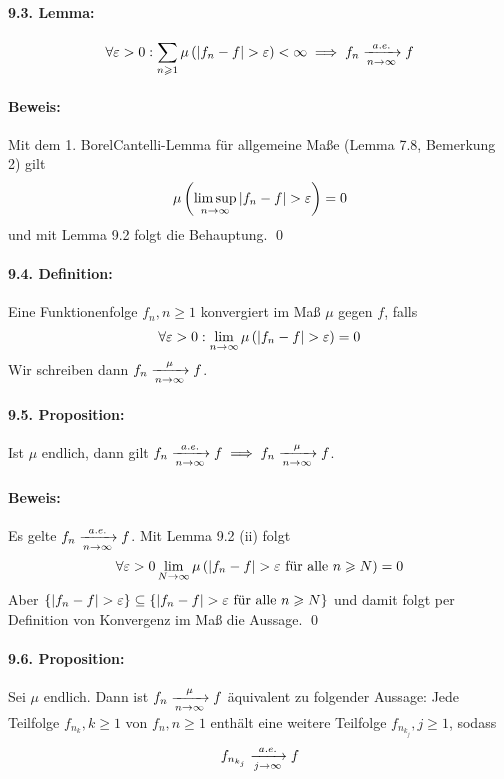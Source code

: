 \paragraph{9.3. Lemma:}
$$\forall\eps>0:\sum_{n\geq1}\mu\left(|f_n-f|>\eps\right)<\infty\implies f_n\nto{a.e.}{n\to\infty}f$$

\paragraph{Beweis:}Mit dem 1. Borel\textendash Cantelli-Lemma f\"ur allgemeine Ma\ss{}e (Lemma 7.8, Bemerkung 2) gilt 
$$\mu\left(\limsup_{n\to\infty}{|f_n-f|>\eps}\right)=0$$
und mit Lemma 9.2 folgt die Behauptung. \qed

\paragraph{9.4. Definition:}Eine Funktionenfolge $f_n,n\geq1$ konvergiert im Ma\ss{} $\mu$ gegen $f$, falls
$$\forall\eps>0:\lim_{n\to\infty}\mu\left(|f_n-f|>\eps\right)=0$$
Wir schreiben dann $f_n\nto{\mu}{n\to\infty}f$.

\paragraph{9.5. Proposition:}Ist $\mu$ endlich, dann gilt $f_n\nto{a.e.}{n\to\infty}f\implies f_n\nto{\mu}{n\to\infty}f$.

\paragraph{Beweis:}Es gelte $f_n\nto{a.e.}{n\to\infty}f$. Mit Lemma 9.2 (ii) folgt
$$\forall\eps>0\lim_{N\to\infty}\mu\left(|f_n-f|>\eps\text{ f\"ur alle }n\geq N\right)=0$$
Aber $\{|f_n-f|>\eps\}\subseteq \left\{|f_n-f|>\eps\text{ f\"ur alle }n\geq N\right\}$
und damit folgt per Definition von Konvergenz im Ma\ss{} die Aussage. \qed

\paragraph{9.6. Proposition:} Sei $\mu$ endlich. Dann ist $f_n\nto{\mu}{n\to\infty}f$ \"aquivalent zu folgender Aussage:\newline
Jede Teilfolge $f_{n_k},k\geq1$ von $f_n,n\geq1$ enth\"alt eine weitere Teilfolge $f_{n_{k_j}},j\geq1$, sodass 
$$f_{n_{k_j}}\nto{a.e.}{j\to\infty}f$$

